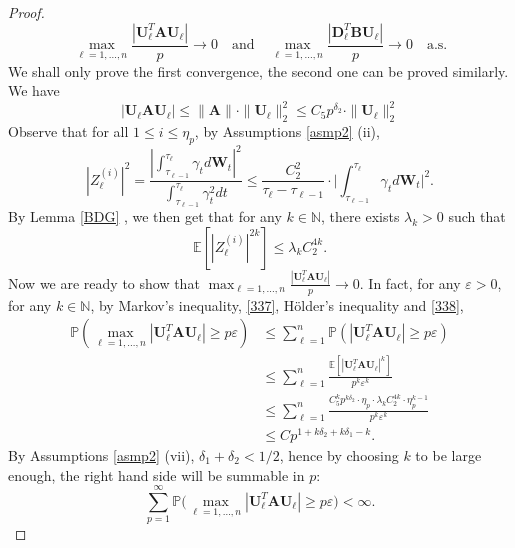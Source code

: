 \documentclass[a4paper,11pt]{book}
\theoremstyle{plain}
\theoremstyle{definition}
\newcommand{\ME}{\mathbb{E}}
\newcommand{\MP}{\mathbb{P}}
\newcommand{\MN}{\mathbb{N}}
\begin{document}
\begin{proof}
    	\[ \max_{\ell = 1, \dots, n} \frac{| \mathbf{U}_\ell^T \mathbf{A} \mathbf{U}_\ell |}{p} \rightarrow 0 \quad \text{and} \quad \max_{\ell = 1, \dots, n} \frac{| \mathbf{D}_\ell^T \mathbf{B} \mathbf{U}_\ell |}{p} \rightarrow 0 \quad \text{a.s.} \]
    	We shall only prove the first convergence, the second one can be proved similarly. We have
    	\begin{equation} \label{337}
    		|\mathbf{U}_\ell \mathbf{A} \mathbf{U}_\ell| \leq \|\mathbf{A}\| \cdot \|\mathbf{U}_\ell\|_2^2 \leq C_5 p^{\delta_2} \cdot \|\mathbf{U}_\ell\|_2^2
    	\end{equation}
    	Observe that for all $1 \leq i \leq \eta_p$, by Assumptions \ref{asmp2} (ii),
    	\[ | Z_\ell^{(i)} |^2 = \frac{|\int_{\tau_{\ell-1}}^{\tau_\ell} \gamma_t d\mathbf{W}_t|^2}{\int_{\tau_{\ell-1}}^{\tau_\ell} \gamma_t^2 dt} \leq \frac{C_2^2}{\tau_\ell-\tau_{\ell-1} } \cdot \Bigg|\int_{\tau_{\ell-1}}^{\tau_\ell} \gamma_t d\mathbf{W}_t \Bigg|^2. \] 
    	By Lemma \ref{BDG} , we then get that for any $k \in \MN$, there exists $\lambda_k > 0$ such that
    	\begin{equation} \label{338}
    		\ME[ |Z_\ell^{(i)}|^{2k} ] \leq \lambda_k C_2^{4k}.
    	\end{equation}
    	Now we are ready to show that $\max_{\ell = 1, \dots, n} \frac{| \mathbf{U}_\ell^T \mathbf{A} \mathbf{U}_\ell |}{p} \rightarrow 0 $. In fact, for any $\varepsilon > 0$, for any $k \in \MN$, by Markov's inequality, \eqref{337}, H\"older's inequality and \eqref{338},
    	\[ 
    	\begin{aligned}
    	\MP(\max_{\ell = 1, \dots, n} | \mathbf{U}_\ell^T \mathbf{A} \mathbf{U}_\ell | \geq p\varepsilon) & \leq \sum_{\ell=1}^{n} \MP(|\mathbf{U}_\ell^T \mathbf{A} \mathbf{U}_\ell | \geq p\varepsilon) \\
    	& \leq \sum_{\ell=1}^{n} \frac{\ME[ |\mathbf{U}_\ell^T \mathbf{A} \mathbf{U}_\ell|^k ]}{ p^k \varepsilon^k } \\
    	& \leq \sum_{\ell=1}^{n} \frac{ C_5^k p^{k \delta_2}  \cdot \eta_p \cdot \lambda_k C_2^{4k} \cdot \eta_p^{k-1} }{p^k\varepsilon^k} \\
    	& \leq C p^{1+k\delta_2 + k\delta_1 - k}.
    	\end{aligned}
    	 \]
    	 By Assumptions \ref{asmp2} (vii), $\delta_1 + \delta_2 < 1/2$, hence by choosing $k$ to be large enough, the right hand side will be summable in $p$: 
    	 \[ \sum_{p=1}^{\infty} \MP\big(\max_{\ell = 1, \dots, n} | \mathbf{U}_\ell^T \mathbf{A} \mathbf{U}_\ell | \geq p\varepsilon\big) < \infty. \]

\end{proof}
\end{document}
